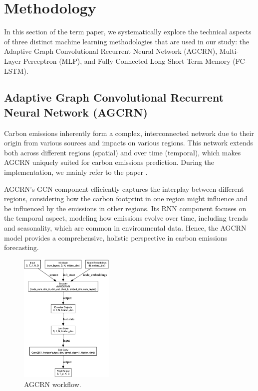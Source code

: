 \documentclass[sigconf, authordraft]{acmart}
\begin{document}
\section{Methodology}


In this section of the term paper, we systematically explore the technical aspects
of three distinct machine learning methodologies that are used in our study:
the Adaptive Graph Convolutional Recurrent Neural Network (AGCRN), Multi-Layer
Perceptron (MLP), and Fully Connected Long Short-Term Memory (FC-LSTM).

\subsection{Adaptive Graph Convolutional Recurrent Neural Network (AGCRN)}


Carbon emissions inherently form a complex, interconnected network due to their
origin from various sources and impacts on various regions. This network
extends both across different regions (spatial) and over time (temporal), which
makes AGCRN uniquely suited for carbon emissions prediction. During the
implementation, we mainly refer to the paper \cite{bai2020-adaptivea}.

AGCRN's GCN component efficiently captures the interplay between different regions,
considering how the carbon footprint in one region might influence and be
influenced by the emissions in other regions. Its RNN component focuses on the
temporal aspect, modeling how emissions evolve over time, including trends and
seasonality, which are common in environmental data. Hence, the AGCRN model
provides a comprehensive, holistic perspective in carbon emissions forecasting.

\begin{figure}[ht]
	\centering
	\includegraphics[width=0.4\textwidth]{figures/AGCRN_flow.png}
	\caption{AGCRN workflow.}
	\label{fig:AGCRN_flow}
\end{figure}
\end{document}
